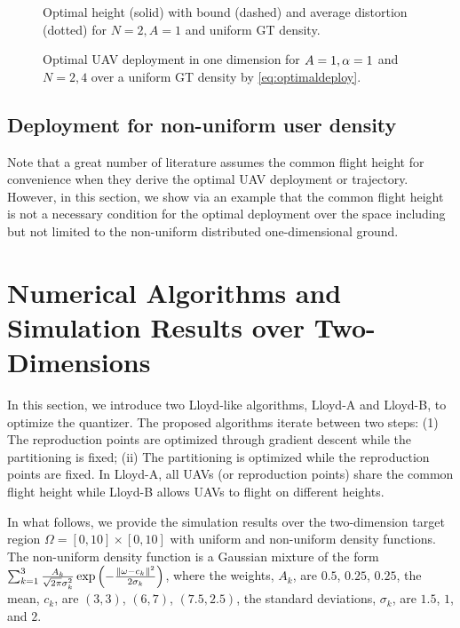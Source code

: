 \documentclass[smallabstract,smallcaptions]{dccpaper}
\newcounter{example}[section]
\newcommand{\junstart}{\color{black}}
\begin{document}
% 
\begin{figure}
\begin{minipage}[b]{0.4\textwidth}
  \vspace{1ex}
\def\svgwidth{1.1\textwidth} \scriptsize{
  }
  \vspace{-3.2ex}
  \caption{{\small Optimal height (solid) with bound (dashed) and average distortion (dotted) for $N=2,A=1$ and uniform GT density.}}
  \label{fig:goptdopt}
\end{minipage}
\hfill
  \begin{minipage}[b]{0.56\textwidth}
\hspace{-2ex} 
    \def\svgwidth{1.1\textwidth} \scriptsize{
      }
      \caption{{\small Optimal UAV deployment in one dimension for $A=1,\alpha=1$ and $N=2,4$ over a uniform GT density
      by \eqref{eq:optimaldeploy}.}}
      \label{fig:uavonedim}
    \end{minipage}
\end{figure}
%


\junstart
{} %
\subsection{Deployment for non-uniform user density}
%
Note that a great number of literature assumes the common flight height for convenience when they derive the optimal UAV
deployment or trajectory.  However, in this section, we show via an example that the common flight height is not a
necessary condition for the optimal deployment over the space including but not limited to the non-uniform distributed
one-dimensional ground.
\fi %

\section{Numerical Algorithms and Simulation Results over Two-Dimensions}
%
In this section, we introduce two Lloyd-like algorithms, Lloyd-A and Lloyd-B, to optimize the quantizer. The proposed
algorithms iterate between two steps: (1) The reproduction points are optimized through gradient descent while the
partitioning is fixed; (ii) The partitioning is optimized while the reproduction points are fixed.  In Lloyd-A, all UAVs
(or reproduction points) share the common flight height while Lloyd-B allows UAVs to flight on different heights.

In what follows, we provide the simulation results over the two-dimension target region $\Omega=[0,10]\times[0,10]$ with
uniform and non-uniform density functions.  The non-uniform density function is a Gaussian mixture of the form
$\sum_{k=1}^{3}\frac{A_k}{\sqrt{2\pi}\sigma^2_k}\exp{\left(-\frac{\|\ensuremath{\omega}-c_k\|^2}{2\sigma_k}\right)}$, where the
weights, $A_k$, are $0.5$, $0.25$, $0.25$, the mean, $c_k$, are $(3,3)$, $(6,7)$, $(7.5,2.5)$, the standard deviations,
$\sigma_k$, are  $1.5$, $1$, and $2$.
\end{document}
